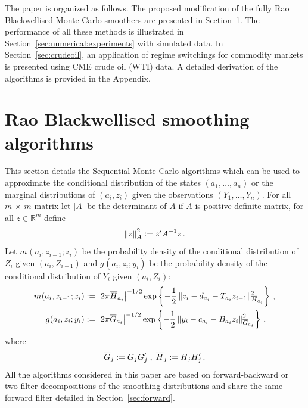 The paper is organized as follows. The proposed modification of the fully Rao Blackwellised Monte Carlo smoothers are presented in Section~\ref{sec:RaoBlackwell}. The performance of all these methods is illustrated in Section~\ref{sec:numerical:experiments} with simulated data. In Section~\ref{sec:crudeoil}, an application of regime switchings for commodity markets is presented using CME crude oil (WTI) data. A detailed derivation of the algorithms is provided in the Appendix.


\section{Rao Blackwellised smoothing algorithms}
\label{sec:RaoBlackwell}
This section details the Sequential Monte Carlo algorithms which can be used to approximate the conditional distribution of the states $(a_1,\ldots,a_n)$ or the marginal distributions of $(a_i,z_{i})$ given the observations $(Y_1,\ldots,Y_n)$. For all $m\,\times\,m$ matrix  let $|A|$ be the determinant of $A$ if $A$ is positive-definite matrix, for all $z\in\mathbb{R}^{m}$ define
\[
\normMat{A}{z}^2 \eqdef z'A^{-1}z\eqsp.
\]
Let $m_{}(a_{i},z_{i-1};z_i)$ be the probability density of the conditional distribution of $Z_i$ given $(a_{i},Z_{i-1})$ and $g_{}(a_{i},z_{i};y_i)$ be the probability density of the conditional distribution of $Y_i$ given $(a_{i},Z_{i})$:
\begin{align}
\label{eq:definition-m}
m_{}(a_{i},z_{i-1};z_i) & \eqdef \left|2\pi\barH_{a_i}\right|^{-1/2}\exp\left\{-\frac{1}{2}\normMat{\barH_{a_i}}{z_i -d_{a_{i}} -T_{a_{i}}z_{i-1}}^2\right\}\eqsp,\\
\label{eq:definition-g}
g_{}(a_{i},z_{i};y_i) & \eqdef \left|2\pi\barG_{a_i}\right|^{-1/2}\exp\left\{-\frac{1}{2}\normMat{\barG_{a_i}}{y_i - c_{a_i} - B_{a_i}z_{i}}^2\right\}\eqsp,
\end{align}
where
\[
\barG_j \eqdef G_jG'_j\;,\; \barH_{j} \eqdef H_jH'_j\eqsp.
\]
All the algorithms considered in this paper are based on forward-backward or two-filter decompositions of the smoothing distributions and share the same forward filter detailed in Section~\ref{sec:forward}.

